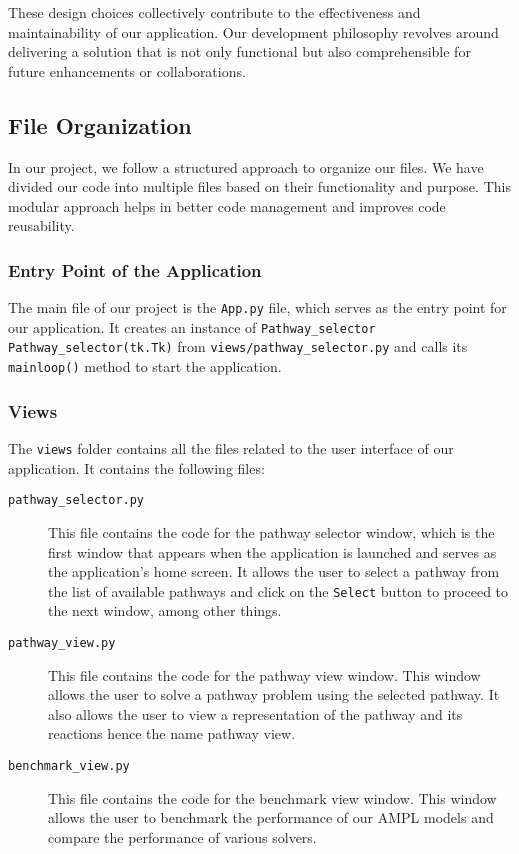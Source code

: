 These design choices collectively contribute to the effectiveness and maintainability of our application. Our development philosophy revolves around delivering a solution that is not only functional but also comprehensible for future enhancements or collaborations.

\subsection{File Organization}
\label{subsec:file_organization}

In our project, we follow a structured approach to organize our files. 
We have divided our code into multiple files based on their functionality and purpose. 
This modular approach helps in better code management and improves code reusability.

\subsubsection{Entry Point of the Application}

The main file of our project is the \texttt{App.py} file, which serves as the entry point for our application. 
It creates an instance of \texttt{Pathway\_selector} \texttt{Pathway\_selector(tk.Tk)} from \texttt{views/pathway\_selector.py} and calls its \texttt{mainloop()} method to start the application.

\subsubsection{Views}

The \texttt{views} folder contains all the files related to the user interface of our application.
It contains the following files:

\begin{description}
    \item[\texttt{pathway\_selector.py}] This file contains the code for the pathway selector window, which is the first window that appears when the application is launched and serves as the application's home screen. It allows the user to select a pathway from the list of available pathways and click on the \texttt{Select} button to proceed to the next window, among other things.
    \item[\texttt{pathway\_view.py}] This file contains the code for the pathway view window. This window allows the user to solve a pathway problem using the selected pathway. It also allows the user to view a representation of the pathway and its reactions hence the name pathway view.
    \item[\texttt{benchmark\_view.py}] This file contains the code for the benchmark view window. This window allows the user to benchmark the performance of our AMPL models and compare the performance of various solvers.
\end{description}

